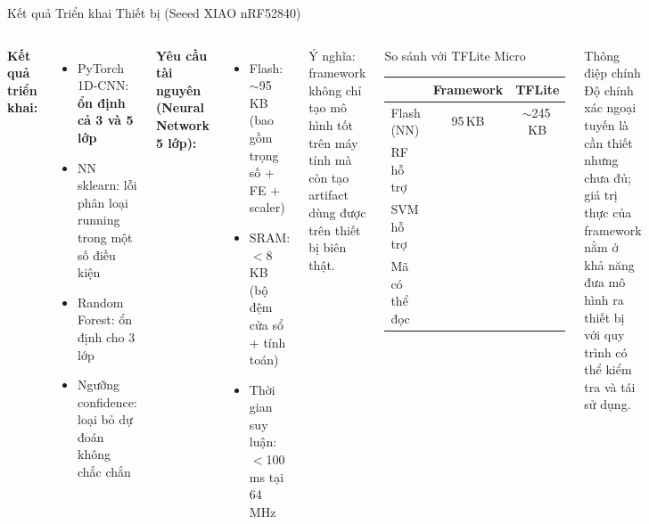 \documentclass[aspectratio=169,12pt]{beamer}
\newcommand{\cmark}{\textcolor{green!60!black}{\ding{51}}}
\newcommand{\xmark}{\textcolor{red!70!black}{\ding{55}}}
\begin{document}
\begin{frame}{Kết quả Triển khai Thiết bị (Seeed XIAO nRF52840)}
  \begin{columns}[T]
      \textbf{Kết quả triển khai:}
      \begin{itemize}\small
        \item PyTorch 1D-CNN: \textbf{ổn định cả 3 và 5 lớp}
        \item NN sklearn: lỗi phân loại running trong một số điều kiện
        \item Random Forest: ổn định cho 3 lớp
        \item Ngưỡng confidence: loại bỏ dự đoán không chắc chắn
      \end{itemize}

      \vspace{6pt}
      \textbf{Yêu cầu tài nguyên (Neural Network 5 lớp):}
      \begin{itemize}\small
        \item Flash: $\sim$95\,KB (bao gồm trọng số + FE + scaler)
        \item SRAM: $<$8\,KB (bộ đệm cửa sổ + tính toán)
        \item Thời gian suy luận: $<$100\,ms tại 64\,MHz
      \end{itemize}
      \vspace{4pt}
      \small Ý nghĩa: framework không chỉ tạo mô hình tốt trên máy tính mà còn tạo artifact dùng được trên thiết bị biên thật.

      \begin{block}{So sánh với TFLite Micro}
        \small
        \begin{tabular}{@{}lcc@{}}
          \toprule
          & Framework & TFLite \\
          \midrule
          Flash (NN) & 95\,KB & $\sim$245\,KB \\
          RF hỗ trợ & \cmark & \xmark \\
          SVM hỗ trợ & \cmark & \xmark \\
          Mã có thể đọc & \cmark & \xmark \\
          \bottomrule
        \end{tabular}
      \end{block}

      \vspace{6pt}
      \begin{alertblock}{\small Thông điệp chính}
        \scriptsize
        Độ chính xác ngoại tuyến là cần thiết nhưng chưa đủ; giá trị thực của framework nằm ở khả năng đưa mô hình ra thiết bị với quy trình có thể kiểm tra và tái sử dụng.
      \end{alertblock}
  \end{columns}
\end{frame}
\end{document}
